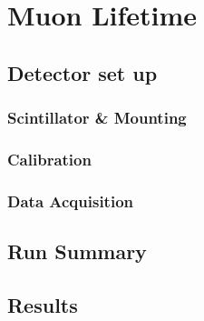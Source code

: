 \section{Muon Lifetime} %
\label{sec:muon_lifetime}
\subsection{Detector set up} %
\label{sub:lifetime_detector_set_up}
\subsubsection{Scintillator & Mounting} %
\label{ssub:lifetime_scintillator_mounting}

\subsubsection{Calibration} %
\label{ssub:lifetime_calibration}

\subsubsection{Data Acquisition} %
\label{ssub:lifetime_data_acquisition}

\subsection{Run Summary} %
\label{sub:lifetime_run_summary}

\subsection{Results} %
\label{sub:lifetime_results}

